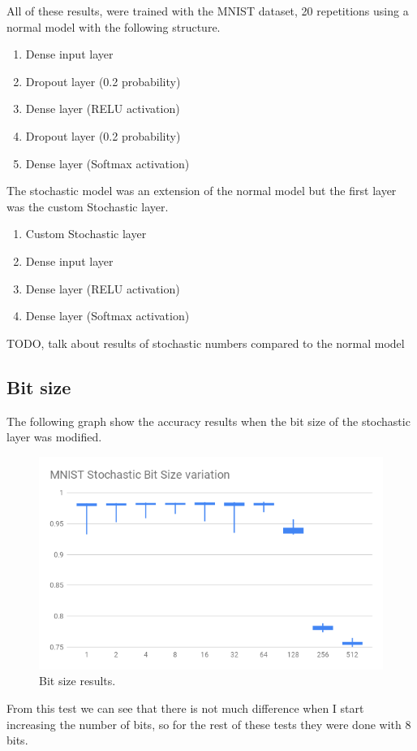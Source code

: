\documentclass[a4paper,oneside,phd,etd]{BYUPhys}
\begin{document}
All of these results, were trained with the MNIST dataset, 20 repetitions using a normal model with the following structure.
\begin{enumerate}
	\item Dense input layer
	\item Dropout layer (0.2 probability)
    \item Dense layer (RELU activation)
   	\item Dropout layer (0.2 probability)
    \item Dense layer (Softmax activation)
\end{enumerate}
The stochastic model was an extension of the normal model but the first layer was the custom Stochastic layer.
\begin{enumerate}
	\item Custom Stochastic layer
	\item Dense input layer
    \item Dense layer (RELU activation)
    \item Dense layer (Softmax activation)
\end{enumerate}

TODO, talk about results of stochastic numbers compared to the normal model

\subsection{Bit size}
The following graph show the accuracy results when the bit size of the stochastic layer was modified.
\begin{figure}[H]
\centering
\includegraphics[width=12cm]{results/bitsize.png}
\caption{Bit size results.}
\label{fig:bitsize}
\end{figure}
From this test we can see that there is not much difference when I start increasing the number of bits, so for the rest of these tests they were done with 8 bits.
\end{document}
